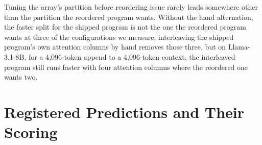 \documentclass{article}
\begin{document}
Tuning the array's partition before reordering issue rarely leads somewhere other than the partition the reordered program wants. Without the hand alternation, the faster split for the shipped program is not the one the reordered program wants at three of the configurations we measure; interleaving the shipped program's own attention columns by hand removes those three, but on Llama-3.1-8B, for a 4{,}096-token append to a 4{,}096-token context, the interleaved program still runs faster with four attention columns where the reordered one wants two.


\section{Registered Predictions and Their Scoring}
\label{subsec:tests}
\end{document}
